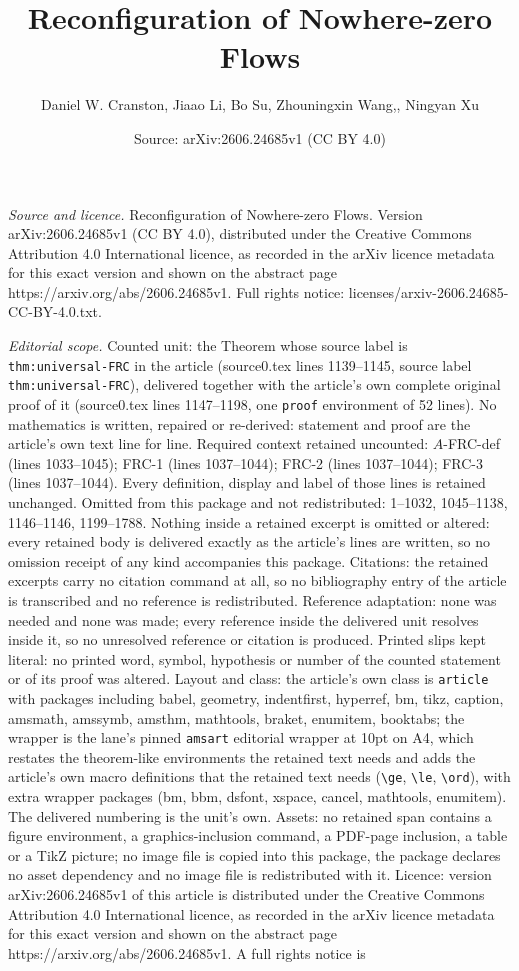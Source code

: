 \documentclass[10pt,a4paper]{amsart}
\title[Reconfiguration of Nowhere-zero Flows]{Reconfiguration of Nowhere-zero Flows}
\author{Daniel W. Cranston, Jiaao Li, Bo Su, Zhouningxin Wang,, Ningyan Xu}
\date{Source: arXiv:2606.24685v1 (CC BY 4.0)}
\begin{document}
\maketitle

\noindent\emph{Source and licence.} Reconfiguration of Nowhere-zero Flows. Version arXiv:2606.24685v1 (CC BY 4.0), distributed under the Creative Commons Attribution 4.0 International licence, as recorded in the arXiv licence metadata for this exact version and shown on the abstract page https://arxiv.org/abs/2606.24685v1. Full rights notice: licenses/arxiv-2606.24685-CC-BY-4.0.txt.\par\smallskip

\noindent\textit{Editorial scope.} Counted unit: the Theorem whose source label is \texttt{thm:universal-FRC} in the article (source0.tex lines 1139--1145, source label \texttt{thm:universal-FRC}), delivered together with the article's own complete original proof of it (source0.tex lines 1147--1198, one \texttt{proof} environment of 52 lines). No mathematics is written, repaired or re-derived: statement and proof are the article's own text line for line. Required context retained uncounted: $A$-FRC-def (lines 1033--1045); FRC-1 (lines 1037--1044); FRC-2 (lines 1037--1044); FRC-3 (lines 1037--1044). Every definition, display and label of those lines is retained unchanged. Omitted from this package and not redistributed: 1--1032, 1045--1138, 1146--1146, 1199--1788. Nothing inside a retained excerpt is omitted or altered: every retained body is delivered exactly as the article's lines are written, so no omission receipt of any kind accompanies this package. Citations: the retained excerpts carry no citation command at all, so no bibliography entry of the article is transcribed and no reference is redistributed. Reference adaptation: none was needed and none was made; every reference inside the delivered unit resolves inside it, so no unresolved reference or citation is produced. Printed slips kept literal: no printed word, symbol, hypothesis or number of the counted statement or of its proof was altered. Layout and class: the article's own class is \texttt{article} with packages including babel, geometry, indentfirst, hyperref, bm, tikz, caption, amsmath, amssymb, amsthm, mathtools, braket, enumitem, booktabs; the wrapper is the lane's pinned \texttt{amsart} editorial wrapper at 10pt on A4, which restates the theorem-like environments the retained text needs and adds the article's own macro definitions that the retained text needs (\texttt{\textbackslash ge}, \texttt{\textbackslash le}, \texttt{\textbackslash ord}), with extra wrapper packages (bm, bbm, dsfont, xspace, cancel, mathtools, enumitem). The delivered numbering is the unit's own. Assets: no retained span contains a figure environment, a graphics-inclusion command, a PDF-page inclusion, a table or a TikZ picture; no image file is copied into this package, the package declares no asset dependency and no image file is redistributed with it. Licence: version arXiv:2606.24685v1 of this article is distributed under the Creative Commons Attribution 4.0 International licence, as recorded in the arXiv licence metadata for this exact version and shown on the abstract page https://arxiv.org/abs/2606.24685v1. A full rights notice is 
\end{document}
